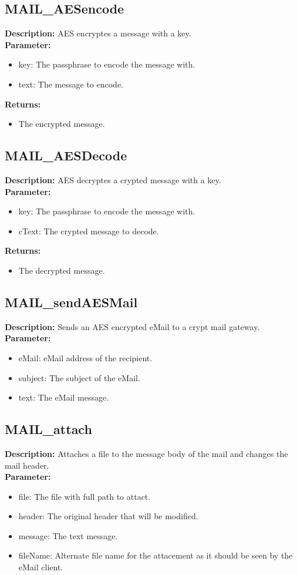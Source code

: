 \subsection{MAIL\_AESencode}
\textbf{Description:} AES encryptes a message with a key.\\
\textbf{Parameter:}
\begin{itemize}
\item key: The passphrase to encode the message with.
\item text: The message to encode.
\end{itemize}
\textbf{Returns:}
\begin{itemize}
\item The encrypted message.
\end{itemize}

\subsection{MAIL\_AESDecode}
\textbf{Description:} AES decryptes a crypted message with a key.\\
\textbf{Parameter:}
\begin{itemize}
\item key: The passphrase to encode the message with.
\item cText: The crypted message to decode.
\end{itemize}
\textbf{Returns:}
\begin{itemize}
\item The decrypted message.
\end{itemize}

\subsection{MAIL\_sendAESMail}
\textbf{Description:} Sends an AES encrypted eMail to a crypt mail gateway.\\
\textbf{Parameter:}
\begin{itemize}
\item eMail: eMail address of the recipient.
\item subject: The subject of the eMail.
\item text: The eMail message.
\end{itemize}

\subsection{MAIL\_attach}
\textbf{Description:} Attaches a file to the message body of the mail and changes the mail header.\\
\textbf{Parameter:}
\begin{itemize}
\item file: The file with full path to attact.
\item header: The original header that will be modified.
\item message: The text message.
\item fileName: Alternate file name for the attacement as it should be seen by the eMail client.
\end{itemize}

